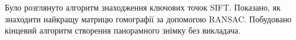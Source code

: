 \chapterConclusion

Було розглянуто алгоритм знаходження ключових точок SIFT.
Показано, як знаходити найкращу матрицю гомографії за 
допомогою RANSAC. Побудовано кінцевий алгоритм створення
панорамного знімку без викладача.
